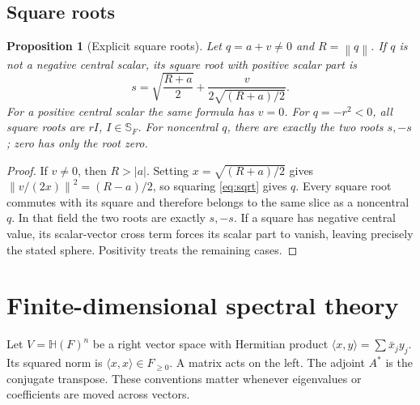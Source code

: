 \documentclass[11pt,letterpaper]{article}
\newtheorem{proposition}[theorem]{Proposition}
\theoremstyle{definition}
\newcommand{\HH}{\mathbb H}
\newcommand{\Ss}{\mathbb S_F}
\newcommand{\abs}[1]{\left|#1\right|}
\newcommand{\norm}[1]{\left\lVert#1\right\rVert}
\begin{document}
\subsection{Square roots}
\begin{proposition}[Explicit square roots]
\label{prop:sqrt}
Let $q=a+v\ne0$ and $R=\norm q$. If $q$ is not a negative central scalar, its
square root with positive scalar part is
\begin{equation}
 s=\sqrt{\frac{R+a}{2}}+
       \frac{v}{2\sqrt{(R+a)/2}}.
 \label{eq:sqrt}
\end{equation}
For a positive central scalar the same formula has $v=0$. For $q=-r^2<0$, all
square roots are $rI$, $I\in\Ss$. For noncentral $q$, there are exactly the two
roots $s,-s$; zero has only the root zero.
\end{proposition}
\begin{proof}
If $v\ne0$, then $R>\abs a$. Setting $x=\sqrt{(R+a)/2}$ gives
$\norm{v/(2x)}^2=(R-a)/2$, so squaring \eqref{eq:sqrt} gives $q$.
Every square root commutes with its square and therefore belongs to the same
slice as a noncentral $q$. In that field the two roots are exactly $s,-s$.
If a square has negative central value, its scalar-vector cross term forces its
scalar part to vanish, leaving precisely the stated sphere. Positivity treats
the remaining cases.
\end{proof}

\section{Finite-dimensional spectral theory}
\label{sec:spectral}
Let $V=\HH(F)^n$ be a right vector space with Hermitian product
$\langle x,y\rangle=\sum\bar x_jy_j$. Its squared norm is
$\langle x,x\rangle\in F_{\ge0}$. A matrix acts on the left. The adjoint $A^*$ is
the conjugate transpose. These conventions matter whenever eigenvalues or
coefficients are moved across vectors.
\end{document}
